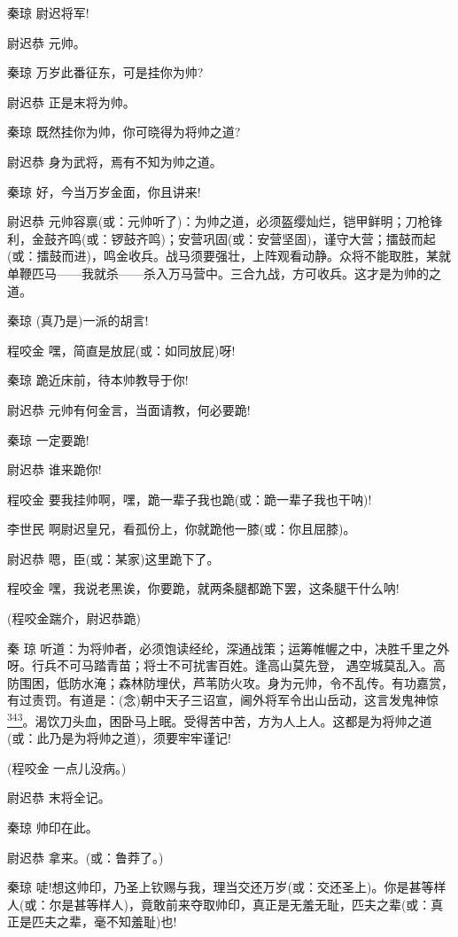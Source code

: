 秦琼 尉迟将军!

尉迟恭 元帅。

秦琼 万岁此番征东，可是挂你为帅?

尉迟恭 正是末将为帅。

秦琼 既然挂你为帅，你可晓得为将帅之道?

尉迟恭 身为武将，焉有不知为帅之道。

秦琼 好，今当万岁金面，你且讲来!

尉迟恭
元帅容禀(或：元帅听了)：为帅之道，必须盔缨灿烂，铠甲鲜明；刀枪锋利，金鼓齐鸣(或：锣鼓齐鸣)；安营巩固(或：安营坚固)，谨守大营；擂鼓而起(或：擂鼓而进)，鸣金收兵。战马须要强壮，上阵观看动静。众将不能取胜，某就单鞭匹马------我就杀------杀入万马营中。三合九战，方可收兵。这才是为帅的之道。

秦琼 (真乃是)一派的胡言!

程咬金 嘿，简直是放屁(或：如同放屁)呀!

秦琼 跪近床前，待本帅教导于你!

尉迟恭 元帅有何金言，当面请教，何必要跪!

秦琼 一定要跪!

尉迟恭 谁来跪你!

程咬金 要我挂帅啊，嘿，跪一辈子我也跪(或：跪一辈子我也干呐)!

李世民 啊尉迟皇兄，看孤份上，你就跪他一膝(或：你且屈膝)。

尉迟恭 嗯，臣(或：某家)这里跪下了。

程咬金 嘿，我说老黑诶，你要跪，就两条腿都跪下罢，这条腿干什么呐!

(程咬金踹介，尉迟恭跪)

秦 琼
听道：为将帅者，必须饱读经纶，深通战策；运筹帷幄之中，决胜千里之外呀。行兵不可马踏青苗；将士不可扰害百姓。逢高山莫先登，
遇空城莫乱入。高防围困，低防水淹；森林防埋伏，芦苇防火攻。身为元帅，令不乱传。有功嘉赏，有过责罚。有道是：(念)朝中天子三诏宣，阃外将军令出山岳动，这言发鬼神惊\protect\hyperlink{fn343}{\textsuperscript{343}}。渴饮刀头血，困卧马上眠。受得苦中苦，方为人上人。这都是为将帅之道(或：此乃是为将帅之道)，须要牢牢谨记!

(程咬金 一点儿没病。)

尉迟恭 末将全记。

秦琼 帅印在此。

尉迟恭 拿来。(或：鲁莽了。)

秦琼
唗!想这帅印，乃圣上钦赐与我，理当交还万岁(或：交还圣上)。你是甚等样人(或：尔是甚等样人)，竟敢前来夺取帅印，真正是无羞无耻，匹夫之辈(或：真正是匹夫之辈，毫不知羞耻)也!

